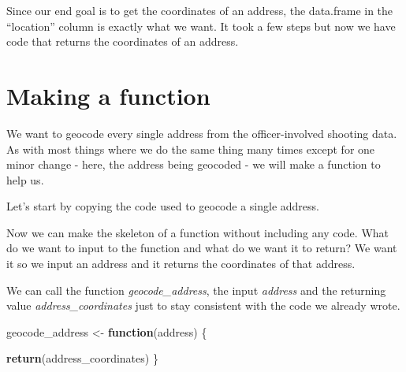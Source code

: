 \documentclass[
  12pt,
]{book}
\newenvironment{Shaded}{\begin{snugshade}}{\end{snugshade}}
\newcommand{\CommentTok}[1]{\textcolor[rgb]{0.37,0.37,0.37}{\textit{#1}}}
\newcommand{\ControlFlowTok}[1]{\textcolor[rgb]{0.27,0.27,0.27}{\textbf{#1}}}
\newcommand{\DecValTok}[1]{\textcolor[rgb]{0.06,0.06,0.06}{#1}}
\newcommand{\KeywordTok}[1]{\textcolor[rgb]{0.27,0.27,0.27}{\textbf{#1}}}
\newcommand{\NormalTok}[1]{#1}
\newcommand{\OperatorTok}[1]{\textcolor[rgb]{0.43,0.43,0.43}{\textbf{#1}}}
\newcommand{\StringTok}[1]{\textcolor[rgb]{0.5,0.5,0.5}{#1}}
\begin{document}
Since our end goal is to get the coordinates of an address, the data.frame in the ``location'' column is exactly what we want. It took a few steps but now we have code that returns the coordinates of an address.

\hypertarget{making-a-function}{%
\section{Making a function}\label{making-a-function}}

We want to geocode every single address from the officer-involved shooting data. As with most things where we do the same thing many times except for one minor change - here, the address being geocoded - we will make a function to help us.

Let's start by copying the code used to geocode a single address.

\begin{Shaded}
\end{Shaded}

Now we can make the skeleton of a function without including any code. What do we want to input to the function and what do we want it to return? We want it so we input an address and it returns the coordinates of that address.

We can call the function \emph{geocode\_address}, the input \emph{address} and the returning value \emph{address\_coordinates} just to stay consistent with the code we already wrote.

\begin{Shaded}
\begin{Highlighting}[]
\NormalTok{geocode\_address <{-}}\StringTok{ }\ControlFlowTok{function}\NormalTok{(address) \{}
   
   \KeywordTok{return}\NormalTok{(address\_coordinates)}
\NormalTok{\}}
\end{Highlighting}
\end{Shaded}
\end{document}
